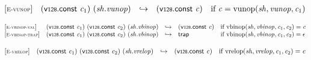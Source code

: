 \vspace{1ex}

$$
\begin{array}{@{}l@{}lcl@{}l@{}}
{[\textsc{\scriptsize E{-}vunop}]} \quad & (\mathsf{v{\scriptstyle128}}.\mathsf{const}~{\mathit{c}}_{{1}})~({\mathit{sh}} . {\mathit{vunop}}) &\hookrightarrow& (\mathsf{v{\scriptstyle128}}.\mathsf{const}~{\mathit{c}}) &\quad
  \mbox{if}~{\mathit{c}} = {\mathrm{vunop}}({\mathit{sh}}, {\mathit{vunop}}, {\mathit{c}}_{{1}}) \\
\end{array}
$$

\vspace{1ex}

$$
\begin{array}{@{}l@{}lcl@{}l@{}}
{[\textsc{\scriptsize E{-}vbinop{-}val}]} \quad & (\mathsf{v{\scriptstyle128}}.\mathsf{const}~{\mathit{c}}_{{1}})~(\mathsf{v{\scriptstyle128}}.\mathsf{const}~{\mathit{c}}_{{2}})~({\mathit{sh}} . {\mathit{vbinop}}) &\hookrightarrow& (\mathsf{v{\scriptstyle128}}.\mathsf{const}~{\mathit{c}}) &\quad
  \mbox{if}~{\mathrm{vbinop}}({\mathit{sh}}, {\mathit{vbinop}}, {\mathit{c}}_{{1}}, {\mathit{c}}_{{2}}) = {\mathit{c}} \\
{[\textsc{\scriptsize E{-}vbinop{-}trap}]} \quad & (\mathsf{v{\scriptstyle128}}.\mathsf{const}~{\mathit{c}}_{{1}})~(\mathsf{v{\scriptstyle128}}.\mathsf{const}~{\mathit{c}}_{{2}})~({\mathit{sh}} . {\mathit{vbinop}}) &\hookrightarrow& \mathsf{trap} &\quad
  \mbox{if}~{\mathrm{vbinop}}({\mathit{sh}}, {\mathit{vbinop}}, {\mathit{c}}_{{1}}, {\mathit{c}}_{{2}}) = \epsilon \\
\end{array}
$$

\vspace{1ex}

$$
\begin{array}{@{}l@{}lcl@{}l@{}}
{[\textsc{\scriptsize E{-}vrelop}]} \quad & (\mathsf{v{\scriptstyle128}}.\mathsf{const}~{\mathit{c}}_{{1}})~(\mathsf{v{\scriptstyle128}}.\mathsf{const}~{\mathit{c}}_{{2}})~({\mathit{sh}} . {\mathit{vrelop}}) &\hookrightarrow& (\mathsf{v{\scriptstyle128}}.\mathsf{const}~{\mathit{c}}) &\quad
  \mbox{if}~{\mathrm{vrelop}}({\mathit{sh}}, {\mathit{vrelop}}, {\mathit{c}}_{{1}}, {\mathit{c}}_{{2}}) = {\mathit{c}} \\
\end{array}
$$

\vspace{1ex}

